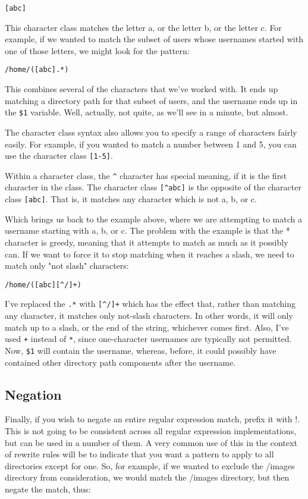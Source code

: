 \verb=[abc]=

This character class matches the letter a, or the letter b, or the letter c. For example, if 
we wanted to match the subset of users whose usernames started with one of those letters, we 
might look for the pattern:

\verb=/home/([abc].*)=

This combines several of the characters that we've worked with. It ends up matching a 
directory path for that subset of users, and the username ends up in the \verb=$1= variable. Well, 
actually, not quite, as we'll see in a minute, but almost.

The character class syntax also allows you to specify a range of characters fairly easily. 
For example, if you wanted to match a number between 1 and 5, you can use the character 
class \verb=[1-5]=.

Within a character class, the \verb=^= character has special meaning, if it is the first character in 
the class. The character class \verb=[^abc]= is the opposite of the character class \verb=[abc]=. That is, it 
matches any character which is not a, b, or c.

Which brings us back to the example above, where we are attempting to match a 
username starting with a, b, or c. The problem with the example is that the * character is 
greedy, meaning that it attempts to match as much as it possibly can. If we want to force it to 
stop matching when it reaches a slash, we need to match only "not slash" characters:

\verb=/home/([abc][^/]+)=

I've replaced the \verb=.*= with \verb=[^/]+= which has the effect that, rather than matching any 
character, it matches only not-slash characters. In other words, it will only match up to a 
slash, or the end of the string, whichever comes first. Also, I've used \verb=+= instead of \verb=*=, since 
one-character usernames are typically not permitted. Now, \verb=$1= will contain the username, 
whereas, before, it could possibly have contained other directory path components after the 
username.

\subsection{Negation}
\index{!}

Finally, if you wish to negate an entire regular expression match, prefix it with !. This is not 
going to be consistent across all regular expression implementations, but can be used in a 
number of them. A very common use of this in the context of rewrite rules will be to indicate 
that you want a pattern to apply to all directories except for one. So, for example, if we 
wanted to exclude the /images directory from consideration, we would match the /images 
directory, but then negate the match, thus:

